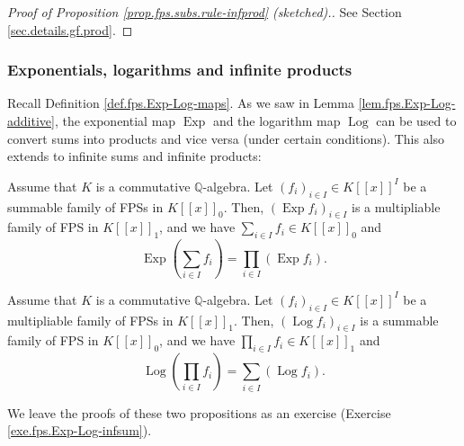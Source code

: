 \begin{proof}
[Proof of Proposition \ref{prop.fps.subs.rule-infprod} (sketched).]See Section
\ref{sec.details.gf.prod}.
\end{proof}

\subsubsection{Exponentials, logarithms and infinite products}

Recall Definition \ref{def.fps.Exp-Log-maps}. As we saw in Lemma
\ref{lem.fps.Exp-Log-additive}, the exponential map $\operatorname*{Exp}$ and
the logarithm map $\operatorname*{Log}$ can be used to convert sums into
products and vice versa (under certain conditions). This also extends to
infinite sums and infinite products:

\begin{proposition}
\label{prop.fps.Exp-Log-infsum}Assume that $K$ is a commutative $\mathbb{Q}%
$-algebra. Let $\left(  f_{i}\right)  _{i\in I}\in K\left[  \left[  x\right]
\right]  ^{I}$ be a summable family of FPSs in $K\left[  \left[  x\right]
\right]  _{0}$. Then, $\left(  \operatorname*{Exp}f_{i}\right)  _{i\in I}$ is
a multipliable family of FPS in $K\left[  \left[  x\right]  \right]  _{1}$,
and we have $\sum_{i\in I}f_{i}\in K\left[  \left[  x\right]  \right]  _{0}$
and%
\[
\operatorname*{Exp}\left(  \sum_{i\in I}f_{i}\right)  =\prod_{i\in I}\left(
\operatorname*{Exp}f_{i}\right)  .
\]

\end{proposition}

\begin{proposition}
\label{prop.fps.Exp-Log-infprod}Assume that $K$ is a commutative $\mathbb{Q}%
$-algebra. Let $\left(  f_{i}\right)  _{i\in I}\in K\left[  \left[  x\right]
\right]  ^{I}$ be a multipliable family of FPSs in $K\left[  \left[  x\right]
\right]  _{1}$. Then, $\left(  \operatorname*{Log}f_{i}\right)  _{i\in I}$ is
a summable family of FPS in $K\left[  \left[  x\right]  \right]  _{0}$, and we
have $\prod\limits_{i\in I}f_{i}\in K\left[  \left[  x\right]  \right]  _{1}$
and%
\[
\operatorname*{Log}\left(  \prod\limits_{i\in I}f_{i}\right)  =\sum_{i\in
I}\left(  \operatorname*{Log}f_{i}\right)  .
\]

\end{proposition}

We leave the proofs of these two propositions as an exercise (Exercise
\ref{exe.fps.Exp-Log-infsum}).
